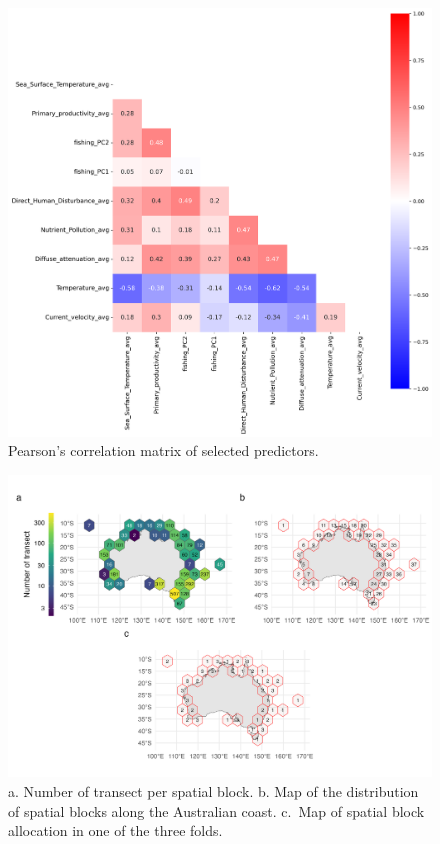 \begin{figure}
\hypertarget{fig:chap3figS3}{%
\centering
\includegraphics{03-Chapitre3/figures/supplementary/05c-corr_plot_all_vars.png}
\caption{Pearson's correlation matrix of selected
predictors.}\label{fig:chap3figS3}
}
\end{figure}

\begin{figure}
\hypertarget{fig:chap3figS4}{%
\centering
\includegraphics{03-Chapitre3/figures/supplementary/06-Spatial_fold_assignment.png}
\caption{a. Number of transect per spatial block. b. Map of the
distribution of spatial blocks along the Australian coast. c.~Map of
spatial block allocation in one of the three
folds.}\label{fig:chap3figS4}
}
\end{figure}

